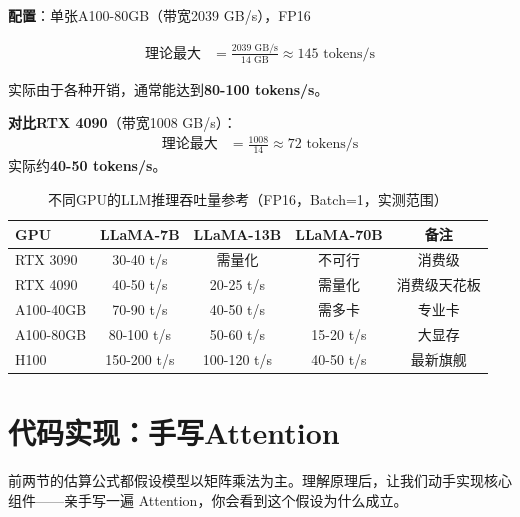 \begin{example}
\textbf{配置}：单张A100-80GB（带宽2039 GB/s），FP16

\begin{align}
    \text{理论最大} &= \frac{2039 \text{ GB/s}}{14 \text{ GB}} \approx 145 \text{ tokens/s}
\end{align}

实际由于各种开销，通常能达到\textbf{80-100 tokens/s}。

\textbf{对比RTX 4090}（带宽1008 GB/s）：
\begin{align}
    \text{理论最大} &= \frac{1008}{14} \approx 72 \text{ tokens/s}
\end{align}
实际约\textbf{40-50 tokens/s}。
\end{example}

\begin{table}[htbp]
\centering
\small
\renewcommand{\arraystretch}{1.3}
\begin{tabular}{l|c|c|c|c}
\toprule
\textbf{GPU} & \textbf{LLaMA-7B} & \textbf{LLaMA-13B} & \textbf{LLaMA-70B} & \textbf{备注} \\
\midrule
RTX 3090 & 30-40 t/s & 需量化 & 不可行 & 消费级 \\
RTX 4090 & 40-50 t/s & 20-25 t/s & 需量化 & 消费级天花板 \\
A100-40GB & 70-90 t/s & 40-50 t/s & 需多卡 & 专业卡 \\
A100-80GB & 80-100 t/s & 50-60 t/s & 15-20 t/s & 大显存 \\
H100 & 150-200 t/s & 100-120 t/s & 40-50 t/s & 最新旗舰 \\
\bottomrule
\end{tabular}
\caption{不同GPU的LLM推理吞吐量参考（FP16，Batch=1，实测范围）}
\end{table}

\section*{代码实现：手写Attention}


前两节的估算公式都假设模型以矩阵乘法为主。理解原理后，让我们动手实现核心组件——亲手写一遍 Attention，你会看到这个假设为什么成立。

